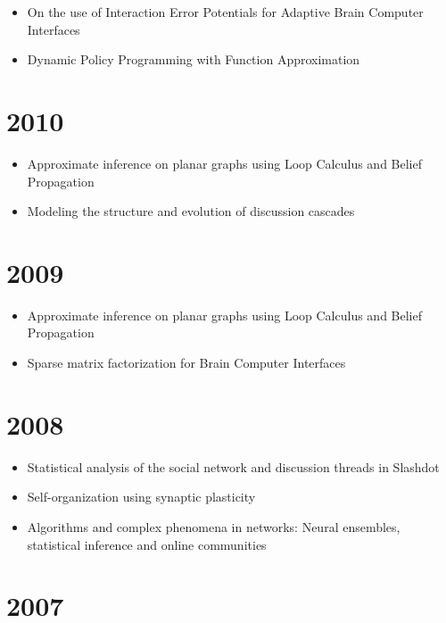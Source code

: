 \documentclass{article}
\begin{document}
\begin{itemize}
\item On the use of Interaction Error Potentials for Adaptive Brain Computer Interfaces~\cite{Llera_Kappen_2011}
\item Dynamic Policy Programming with Function Approximation~\cite{gheslaghi11}
\end{itemize}

\section*{2010}

\begin{itemize}
\item Approximate inference on planar graphs using Loop Calculus and Belief Propagation~\cite{Gomez:2010:AIP:1756006.1859893}
\item Modeling the structure and evolution of discussion cascades~\cite{Gomez:2011:MSE:1995966.1995992}
\end{itemize}

\section*{2009}

\begin{itemize}
\item Approximate inference on planar graphs using Loop Calculus and Belief Propagation~\cite{Gomez:2009:AIP:1795114.1795138}
\item Sparse matrix factorization for Brain Computer Interfaces~\cite{5349481}
\end{itemize}

\section*{2008}

\begin{itemize}
\item Statistical analysis of the social network and discussion threads in Slashdot~\cite{gomez08}
\item Self-organization using synaptic plasticity~\cite{NIPS2008_3394}
\item Algorithms and complex phenomena in networks: Neural ensembles, statistical inference and online communities~\cite{gomez2008thesis}
\end{itemize}

\section*{2007}
\end{document}
